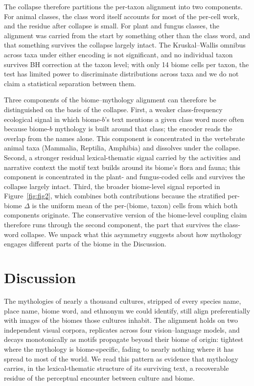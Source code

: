 \documentclass[11pt,a4paper]{article}
\begin{document}
The collapse therefore partitions the per-taxon alignment into
two components. For animal classes, the class word itself
accounts for most of the per-cell work, and the residue after
collapse is small. For plant and fungus classes, the alignment
was carried from the start by something other than the class
word, and that something survives the collapse largely intact.
The Kruskal--Wallis omnibus across taxa under either encoding is
not significant, and no individual taxon survives BH correction
at the taxon level; with only 14 biome cells per taxon, the test
has limited power to discriminate distributions across taxa and
we do not claim a statistical separation between them.

Three components of the biome--mythology alignment can therefore
be distinguished on the basis of the collapse. First, a weaker
class-frequency ecological signal in which biome-$b$'s text
mentions a given class word more often because biome-$b$
mythology is built around that class; the encoder reads the
overlap from the names alone. This component is concentrated in
the vertebrate animal taxa (Mammalia, Reptilia, Amphibia) and
dissolves under the collapse. Second, a stronger residual
lexical-thematic signal carried by the activities and narrative
context the motif text builds around its biome's flora and
fauna; this component is concentrated in the plant- and
fungus-coded cells and survives the collapse largely intact.
Third, the broader biome-level signal reported in
Figure~\ref{fig:fig2}, which combines both contributions because
the stratified per-biome $\Delta$ is the uniform mean of the
per-(biome, taxon) cells from which both components originate.
The conservative version of the biome-level coupling claim
therefore runs through the second component, the part that
survives the class-word collapse. We unpack what this asymmetry
suggests about how mythology engages different parts of the
biome in the Discussion.

\section*{Discussion}

The mythologies of nearly a thousand cultures, stripped of every
species name, place name, biome word, and ethnonym we could
identify, still align preferentially with images of the biomes
those cultures inhabit. The alignment holds on two independent
visual corpora, replicates across four vision--language models,
and decays monotonically as motifs propagate beyond their biome of
origin: tightest where the mythology is biome-specific, fading to
nearly nothing where it has spread to most of the world. We read
this pattern as evidence that mythology carries, in the
lexical-thematic structure of its surviving text, a recoverable
residue of the perceptual encounter between culture and biome.
\end{document}
